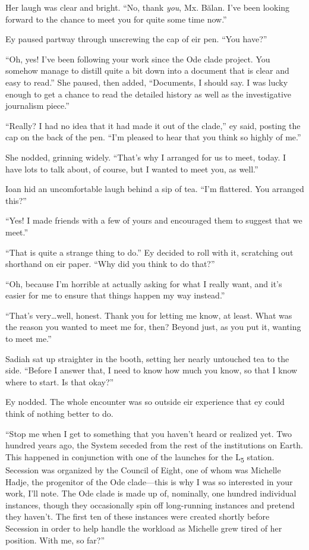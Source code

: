 Her laugh was clear and bright. ``No, thank \emph{you}, Mx. Bălan. I've been looking forward to the chance to meet you for quite some time now.''

Ey paused partway through unscrewing the cap of eir pen. ``You have?''

``Oh, yes! I've been following your work since the Ode clade project. You somehow manage to distill quite a bit down into a document that is clear and easy to read.'' She paused, then added, ``Documents, I should say. I was lucky enough to get a chance to read the detailed history as well as the investigative journalism piece.''

``Really? I had no idea that it had made it out of the clade,'' ey said, posting the cap on the back of the pen. ``I'm pleased to hear that you think so highly of me.''

She nodded, grinning widely. ``That's why I arranged for us to meet, today. I have lots to talk about, of course, but I wanted to meet you, as well.''

Ioan hid an uncomfortable laugh behind a sip of tea. ``I'm flattered. You arranged this?''

``Yes! I made friends with a few of yours and encouraged them to suggest that we meet.''

``That is quite a strange thing to do.'' Ey decided to roll with it, scratching out shorthand on eir paper. ``Why did you think to do that?''

``Oh, because I'm horrible at actually asking for what I really want, and it's easier for me to ensure that things happen my way instead.''

``That's very\ldots well, honest. Thank you for letting me know, at least. What was the reason you wanted to meet me for, then? Beyond just, as you put it, wanting to meet me.''

Sadiah sat up straighter in the booth, setting her nearly untouched tea to the side. ``Before I answer that, I need to know how much you know, so that I know where to start. Is that okay?''

Ey nodded. The whole encounter was so outside eir experience that ey could think of nothing better to do.

``Stop me when I get to something that you haven't heard or realized yet. Two hundred years ago, the System seceded from the rest of the institutions on Earth. This happened in conjunction with one of the launches for the L\textsubscript{5} station. Secession was organized by the Council of Eight, one of whom was Michelle Hadje, the progenitor of the Ode clade---this is why I was so interested in your work, I'll note. The Ode clade is made up of, nominally, one hundred individual instances, though they occasionally spin off long-running instances and pretend they haven't. The first ten of these instances were created shortly before Secession in order to help handle the workload as Michelle grew tired of her position. With me, so far?''

